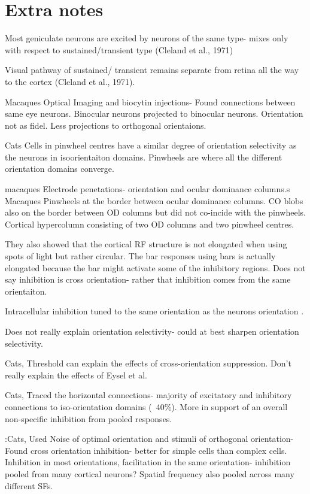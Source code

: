 \chapter{Extra notes}
Most geniculate neurons are excited by neurons of the same type- mixes only with respect to sustained/transient type (Cleland et al., 1971)

Visual pathway of sustained/ transient remains separate from retina all the way to the cortex (Cleland et al., 1971).

\cite{Malach1993} Macaques Optical Imaging and biocytin injections- Found connections between same eye neurons. Binocular neurons projected to binocular neurons. Orientation not as fidel. Less projections to orthogonal orientaions.

\cite{Maldonado1997} Cats Cells in pinwheel centres have a similar degree of orientation selectivity as the neurons in isoorientaiton domains. Pinwheels are where all the different orientation domains converge.

\cite{Hubel1969} macaques Electrode penetations- orientation and ocular dominance columns.s
\cite{Bartfeld1992a} Macaques Pinwheels at the border between ocular dominance columns. CO blobs also on the border between OD columns but did not co-incide with the pinwheels. Cortical hypercolumn consisting of two OD columns and two pinwheel centres. 

They also showed that the cortical RF structure is not elongated when using spots of light but rather circular. The bar responses using bars is actually elongated because the bar might activate some of the inhibitory regions. Does not say inhibition is cross orientation- rather that inhibition comes from the same orientaiton. 

Intracellular inhibition tuned to the same orientation as the neurons orientation \cite{Anderson2000}.

Does not really explain orientation selectivity- could at best sharpen orientation selectivity.

\cite{Priebe2006} Cats, Threshold can explain the effects of cross-orientation suppression. Don't really explain the effects of Eysel et al.

\cite{Kisvarday1997} Cats, Traced the horizontal connections- majority of excitatory and inhibitory connections to iso-orientation domains (~40\%). More in support of an overall non-specific inhibition from pooled responses.

\cite{Morrone1982}:Cats, Used Noise of optimal orientation and stimuli of orthogonal orientation- Found cross orientation inhibition- better for simple cells than complex cells. Inhibition in most orientations, facilitation in the same orientation- inhibition pooled from many cortical neurons? Spatial frequency also pooled across many different SFs.

